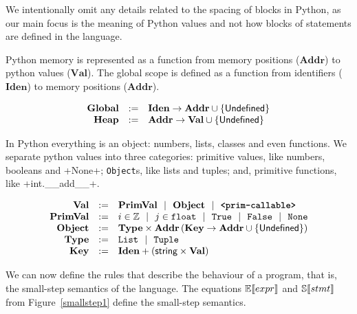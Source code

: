 We intentionally omit any details related to the spacing of blocks in Python, as our main
focus is the meaning of Python values and not how blocks of statements are defined in the
language.

Python memory is represented as a function from memory positions ($\mathbf{Addr}$) to
python values ($\mathbf{Val}$). The global scope is defined as a function from identifiers
($\mathbf{Iden}$) to memory positions ($\mathbf{Addr}$).

$$\begin{array}{rcl}
  \mathbf{Global}  &:=& \mathbf{Iden} \to \mathbf{Addr} \cup \{\mathsf{Undefined}\} \\
  \mathbf{Heap}  &:=& \mathbf{Addr} \to \mathbf{Val} \cup \{\mathsf{Undefined}\} \\
\end{array}$$

In Python everything is an object: numbers, lists, classes and even functions. We separate
python values into three categories: primitive values, like numbers, booleans and
\pycode+None+; \verb+Object+s, like lists and tuples; and, primitive functions, like
\pycode+int.__add__+.

$$\begin{array}{rcl}
  \mathbf{Val} &:=& \mathbf{PrimVal} ~~|~~ \mathbf{Object} ~~|~~ \textbf{\texttt{<prim-callable>}} \\
  \mathbf{PrimVal} &:=& i \in \mathbb{Z} ~~|~~ j \in \texttt{float} ~~|~~ \texttt{True} ~~|~~ \texttt{False} ~~|~~ \texttt{None} \\
  \mathbf{Object} &:=& \mathbf{Type} \times \mathbf{Addr} \left(\mathbf{Key} \to \mathbf{Addr} \cup \{\mathsf{Undefined}\}\right) \\
  \mathbf{Type} &:=& \texttt{List} ~~|~~ \texttt{Tuple} \\
  \mathbf{Key} &:=& \mathbf{Iden} + \left(\textsf{string} \times \mathbf{Val}\right) \\
\end{array}$$

We can now define the rules that describe the behaviour of a program, that is, the
small-step semantics of the language. The equations $\mathbb{E}\!\left\llbracket expr \right\rrbracket$ and $\mathbb{S}\!\left\llbracket stmt \right\rrbracket$
from Figure~\ref{smallstep1} define the small-step semantics.

